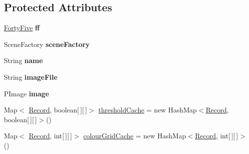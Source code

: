 \subsection*{Protected Attributes}
\begin{DoxyCompactItemize}
\item 
\hypertarget{classdev_1_1boxy_1_1fortyfive_1_1core_1_1image_1_1_image_grid_a5e031098a22edc312fe0f369a5f38eab}{
\hyperlink{classdev_1_1boxy_1_1fortyfive_1_1_forty_five}{FortyFive} {\bfseries ff}}
\label{d1/d3a/classdev_1_1boxy_1_1fortyfive_1_1core_1_1image_1_1_image_grid_a5e031098a22edc312fe0f369a5f38eab}

\item 
\hypertarget{classdev_1_1boxy_1_1fortyfive_1_1core_1_1image_1_1_image_grid_a66e30f768c877d8e44c7b63464935f0d}{
SceneFactory {\bfseries sceneFactory}}
\label{d1/d3a/classdev_1_1boxy_1_1fortyfive_1_1core_1_1image_1_1_image_grid_a66e30f768c877d8e44c7b63464935f0d}

\item 
\hypertarget{classdev_1_1boxy_1_1fortyfive_1_1core_1_1image_1_1_image_grid_ab9fc1b2d505b6cfb45f9b1d2f0fdad85}{
String {\bfseries name}}
\label{d1/d3a/classdev_1_1boxy_1_1fortyfive_1_1core_1_1image_1_1_image_grid_ab9fc1b2d505b6cfb45f9b1d2f0fdad85}

\item 
\hypertarget{classdev_1_1boxy_1_1fortyfive_1_1core_1_1image_1_1_image_grid_a3d390119e42f3d30db17f244cef1d2a8}{
String {\bfseries imageFile}}
\label{d1/d3a/classdev_1_1boxy_1_1fortyfive_1_1core_1_1image_1_1_image_grid_a3d390119e42f3d30db17f244cef1d2a8}

\item 
\hypertarget{classdev_1_1boxy_1_1fortyfive_1_1core_1_1image_1_1_image_grid_a7916f6fdf42627dd936f296983c5a7cb}{
PImage {\bfseries image}}
\label{d1/d3a/classdev_1_1boxy_1_1fortyfive_1_1core_1_1image_1_1_image_grid_a7916f6fdf42627dd936f296983c5a7cb}

\item 
Map$<$ \hyperlink{classdev_1_1boxy_1_1fortyfive_1_1core_1_1image_1_1_image_grid_1_1_record}{Record}, boolean\mbox{[}$\,$\mbox{]}\mbox{[}$\,$\mbox{]}$>$ \hyperlink{classdev_1_1boxy_1_1fortyfive_1_1core_1_1image_1_1_image_grid_a1ce05b9ca4d19763d228d5b536b6d456}{thresholdCache} = new HashMap$<$\hyperlink{classdev_1_1boxy_1_1fortyfive_1_1core_1_1image_1_1_image_grid_1_1_record}{Record}, boolean\mbox{[}$\,$\mbox{]}\mbox{[}$\,$\mbox{]}$>$()
\item 
Map$<$ \hyperlink{classdev_1_1boxy_1_1fortyfive_1_1core_1_1image_1_1_image_grid_1_1_record}{Record}, int\mbox{[}$\,$\mbox{]}\mbox{[}$\,$\mbox{]}$>$ \hyperlink{classdev_1_1boxy_1_1fortyfive_1_1core_1_1image_1_1_image_grid_ae05f9771d64c7dc730d3e78e6b8652f9}{colourGridCache} = new HashMap$<$\hyperlink{classdev_1_1boxy_1_1fortyfive_1_1core_1_1image_1_1_image_grid_1_1_record}{Record}, int\mbox{[}$\,$\mbox{]}\mbox{[}$\,$\mbox{]}$>$()
\end{DoxyCompactItemize}
